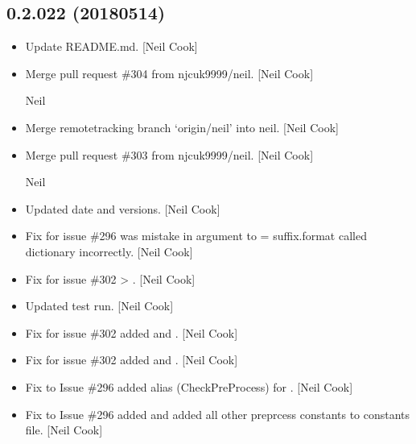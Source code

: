 \documentclass[a4paper,10pt,english]{report}
\begin{document}
\subsection{0.2.022 (2018\sphinxhyphen{}05\sphinxhyphen{}14)}
\label{\detokenize{misc/changelog:id458}}\begin{itemize}
\item {} 
Update README.md. {[}Neil Cook{]}

\item {} 
Merge pull request \#304 from njcuk9999/neil. {[}Neil Cook{]}

Neil

\item {} 
Merge remote\sphinxhyphen{}tracking branch ‘origin/neil’ into neil. {[}Neil Cook{]}

\item {} 
Merge pull request \#303 from njcuk9999/neil. {[}Neil Cook{]}

Neil

\item {} 
Updated date and versions. {[}Neil Cook{]}

\item {} 
Fix for issue \#296 \sphinxhyphen{} was mistake in argument to  =
suffix.format  \sphinxhyphen{} called dictionary incorrectly. {[}Neil Cook{]}

\item {} 
Fix for issue \#302 \sphinxhyphen{}  \textendash{}\textgreater{} . {[}Neil Cook{]}

\item {} 
Updated test run. {[}Neil Cook{]}

\item {} 
Fix for issue \#302 \sphinxhyphen{} added  and . {[}Neil
Cook{]}

\item {} 
Fix for issue \#302 \sphinxhyphen{} added  and . {[}Neil
Cook{]}

\item {} 
Fix to Issue \#296 \sphinxhyphen{} added alias (CheckPreProcess) for
. {[}Neil Cook{]}

\item {} 
Fix to Issue \#296 \sphinxhyphen{} added  and added all other
preprcess constants to constants file. {[}Neil Cook{]}


\end{itemize}
\end{document}
